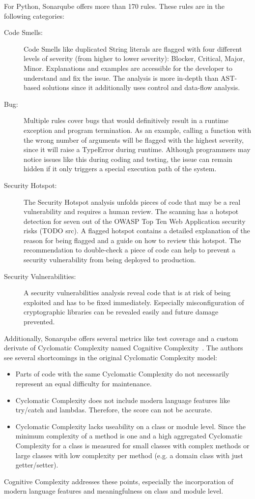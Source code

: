 For Python, Sonarqube offers more than 170 rules. These rules are in the following categories:
\begin{description}
    \item[Code Smells:] Code Smells like duplicated String literals are flagged with four different levels of severity (from higher to lower severity): Blocker, Critical, Major, Minor. Explanations and examples are accessible for the developer to understand and fix the issue. The analysis is more in-depth than AST-based solutions since it additionally uses control and data-flow analysis.
    \item[Bug:] Multiple rules cover bugs that would definitively result in a runtime exception and program termination. As an example, calling a function with the wrong number of arguments will be flagged with the highest severity, since it will raise a TypeError during runtime. Although programmers may notice issues like this during coding and testing, the issue can remain hidden if it only triggers a special execution path of the system.
    \item[Security Hotspot: ] The Security Hotspot analysis unfolds pieces of code that may be a real vulnerability and requires a human review. The scanning has a hotspot detection for seven out of the OWASP Top Ten Web Application security risks (TODO src). A flagged hotspot contains a detailed explanation of the reason for being flagged and a guide on how to review this hotspot. The recommendation to double-check a piece of code can help to prevent a security vulnerability from being deployed to production.
    \item[Security Vulnerabilities: ]  A security vulnerabilities analysis reveal code that is at risk of being exploited and has to be fixed immediately. Especially misconfiguration of cryptographic libraries can be revealed easily and future damage prevented.   
\end{description}

Additionally, Sonarqube offers several metrics like test coverage and a custom derivate of Cyclomatic Complexity named Cognitive Complexity~\cite{campbell2018cognitive}. The authors see several shortcomings in the original Cyclomatic Complexity model:
\begin{itemize}
    \item Parts of code with the same Cyclomatic Complexity do not necessarily represent an equal difficulty for maintenance.
    \item  Cyclomatic Complexity does not include modern language features like try/catch and lambdas. Therefore, the score can not be accurate.
    \item Cyclomatic Complexity lacks useability on a class or module level. Since the minimum complexity of a method is one and a high aggregated Cyclomatic Complexity for a class is measured for small classes with complex methods or large classes with low complexity per method (e.g. a domain class with just getter/setter).
\end{itemize}
Cognitive Complexity addresses these points, especially the incorporation of modern language features and meaningfulness on class and module level.

